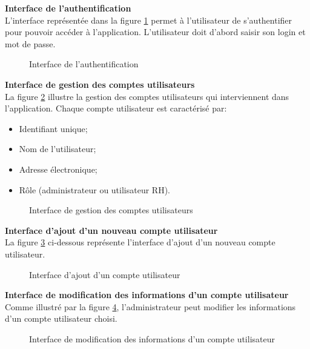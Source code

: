 \textbf{Interface de l'authentification}\\
L’interface représentée dans la figure \ref{fig:authenticationInterface} permet à l’utilisateur de s’authentifier pour pouvoir accéder à l’application. L’utilisateur doit d’abord saisir son login et mot de passe.
\newpage
 \begin{figure}[htpb]
    \centering
    \caption{Interface de l’authentification}
    \label{fig:authenticationInterface}
    \end{figure}

\textbf{Interface de gestion des comptes utilisateurs}\\
La figure \ref{fig:crud_user} illustre la gestion des comptes utilisateurs qui interviennent dans l’application.\newline
Chaque compte utilisateur est caractérisé par:
\begin{itemize}
    \item Identifiant unique;
    \item Nom de l’utilisateur;
    \item Adresse électronique;
    \item Rôle (administrateur ou utilisateur RH).
\end{itemize}
 \begin{figure}[htpb]
    \centering
    \caption{Interface de gestion des comptes utilisateurs}
    \label{fig:crud_user}
    \end{figure}
\newpage
\textbf{Interface d'ajout d’un nouveau compte utilisateur}\\
La figure \ref{fig:addUser} ci-dessous représente l’interface d’ajout d’un nouveau compte utilisateur.
 \begin{figure}[htpb]
    \centering
    \caption{Interface d'ajout d'un compte utilisateur}
    \label{fig:addUser}
    \end{figure}
\newline
\textbf{Interface de modification des informations d’un compte utilisateur}\\
Comme illustré par la figure \ref{fig:updateuser}, l’administrateur peut modifier les informations d'un compte utilisateur choisi.
\begin{figure}[htpb]
    \centering
    \caption{Interface de modification des informations d’un compte utilisateur}
    \label{fig:updateuser}
    \end{figure}
